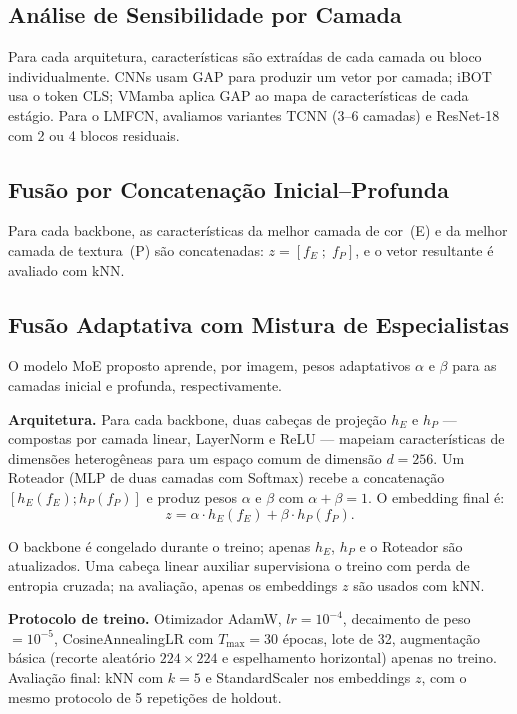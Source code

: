 \documentclass[conference]{IEEEtran}
\begin{document}
\subsection{An\'{a}lise de Sensibilidade por Camada}

Para cada arquitetura, caracter\'{i}sticas s\~{a}o extra\'{i}das de cada
camada ou bloco individualmente.
CNNs usam GAP para produzir um vetor por camada; iBOT usa o token CLS;
VMamba aplica GAP ao mapa de caracter\'{i}sticas de cada est\'{a}gio.
Para o LMFCN, avaliamos variantes TCNN (3--6 camadas) e ResNet-18 com 2
ou 4 blocos residuais.

\subsection{Fus\~{a}o por Concatena\c{c}\~{a}o Inicial--Profunda}

Para cada backbone, as caracter\'{i}sticas da melhor camada de cor~(E) e
da melhor camada de textura~(P) s\~{a}o concatenadas:
$z = [f_E \; ; \; f_P]$, e o vetor resultante \'{e} avaliado com kNN.

\subsection{Fus\~{a}o Adaptativa com Mistura de Especialistas}

O modelo MoE proposto aprende, por imagem, pesos adaptativos $\alpha$ e
$\beta$ para as camadas inicial e profunda, respectivamente.

\textbf{Arquitetura.} Para cada backbone, duas cabe\c{c}as de proje\c{c}\~{a}o
$h_E$ e $h_P$ --- compostas por camada linear, LayerNorm e ReLU ---
mapeiam caracter\'{i}sticas de dimens\~{o}es heterog\^{e}neas para um
espa\c{c}o comum de dimens\~{a}o $d=256$.
Um Roteador (MLP de duas camadas com Softmax) recebe a concatena\c{c}\~{a}o
$[h_E(f_E) ; h_P(f_P)]$ e produz pesos $\alpha$ e $\beta$ com
$\alpha + \beta = 1$.
O embedding final \'{e}:
\begin{equation}
    z = \alpha \cdot h_E(f_E) + \beta \cdot h_P(f_P).
    \label{eq:moe}
\end{equation}

O backbone \'{e} congelado durante o treino; apenas $h_E$, $h_P$ e o
Roteador s\~{a}o atualizados.
Uma cabe\c{c}a linear auxiliar supervisiona o treino com perda de
entropia cruzada; na avalia\c{c}\~{a}o, apenas os embeddings $z$ s\~{a}o
usados com kNN.

\textbf{Protocolo de treino.}
Otimizador AdamW, $lr = 10^{-4}$, decaimento de peso $= 10^{-5}$,
CosineAnnealingLR com $T_{\max} = 30$ \'{e}pocas, lote de 32,
augmenta\c{c}\~{a}o b\'{a}sica (recorte aleat\'{o}rio $224{\times}224$
e espelhamento horizontal) apenas no treino.
Avalia\c{c}\~{a}o final: kNN com $k=5$ e StandardScaler nos embeddings
$z$, com o mesmo protocolo de 5 repeti\c{c}\~{o}es de holdout.
\end{document}
